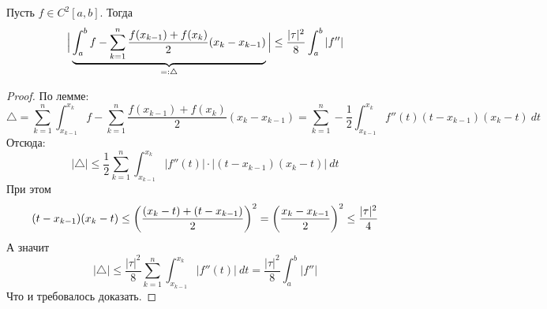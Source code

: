 \begin{theorem}
    Пусть $f \in C^2[a, b]$. Тогда
    \begin{equation*}
        \Big| \underbrace{\int_{a}^{b} f - \sum_{k = 1}^{n}
        \frac{f(x_{k - 1}) + f(x_k)}{2}(x_k - x_{k - 1})}_{\mathclap{=: \triangle}} \Big| \leq
        \frac{|\tau|^2}{8}\int_{a}^{b} |f''|
    \end{equation*}
\end{theorem}
\begin{proof}
  По лемме:
    \begin{equation*}
            \triangle = \sum_{k = 1}^{n} \int_{{x_{k - 1}}}^{{x_k}} {f} -
            \sum_{k = 1}^{n} \frac{f(x_{k - 1}) + f(x_k)}{2}(x_k - x_{k - 1}) =
            \sum_{k = 1}^{n} - \frac{1}{2} \int_{{x_{k - 1}}}^{{x_k}} {f''(t)
            (t - x_{k - 1})(x_k - t)} \: d{t}
    \end{equation*}
    Отсюда:
    \begin{equation*}
            |\triangle| \leq \frac{1}{2} \sum_{k = 1}^{n}
            \int_{{x_{k - 1}}}^{{x_k}} {|f''(t)| \cdot |(t - x_{k - 1})(x_k - t)|} \: d{t}
    \end{equation*}
    При этом
    \begin{equation*}
            (t - x_{k - 1})(x_k - t) \leq \left(\frac{(x_k - t) + (t - x_{k - 1})}{2}\right)^2 =
            \left(\frac{x_k - x_{k - 1}}{2}\right)^2 \leq \frac{|\tau|^2}{4} \\
    \end{equation*}
    А значит
    \begin{equation*}
            |\triangle| \leq
            \frac{|\tau|^2}{8} \sum_{k = 1}^{n} \int_{x_{k - 1}}^{x_k}|f''(t)| \: dt =
            \frac{|\tau|^2}{8} \int_{a}^{b} |f''|
    \end{equation*}
    Что и требовалось доказать.
\end{proof}